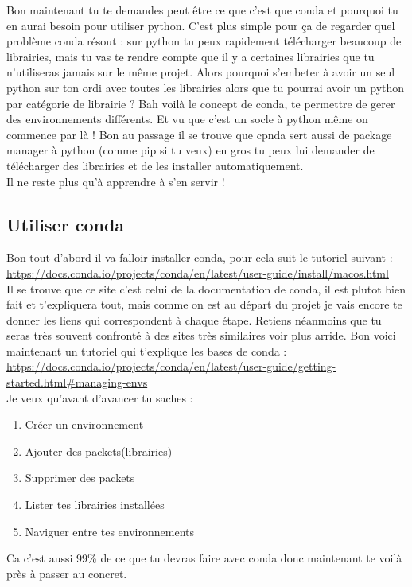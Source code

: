 \documentclass[10pt,a4paper]{book}
\begin{document}
Bon maintenant tu te demandes peut être ce que c'est que conda et pourquoi tu en aurai besoin pour utiliser python. C'est plus simple pour ça de regarder quel problème conda résout : sur python tu peux rapidement télécharger beaucoup de librairies, mais tu vas te rendre compte que il y a certaines librairies que tu n'utiliseras jamais sur le même projet. Alors pourquoi s'embeter à avoir un seul python sur ton ordi avec toutes les librairies alors que tu pourrai avoir un python par catégorie de librairie ? Bah voilà le concept de conda, te permettre de gerer des environnements différents. Et vu que c'est un socle à python même on commence par là ! 
Bon au passage il se trouve que cpnda sert aussi de package manager à python (comme pip si tu veux) en gros tu peux lui demander de télécharger des librairies et de les installer automatiquement.
\\ 
Il ne reste plus qu'à apprendre à s'en servir !

\subsection{Utiliser conda}
Bon tout d'abord il va falloir installer conda, pour cela suit le tutoriel suivant : 
\\
\url{https://docs.conda.io/projects/conda/en/latest/user-guide/install/macos.html}
\\
Il se trouve que ce site c'est celui de la documentation de conda, il est plutot bien fait et t'expliquera tout, mais comme on est au départ du projet je vais encore te donner les liens qui correspondent à chaque étape. Retiens néanmoins que tu seras très souvent confronté à des sites très similaires voir plus arride.
Bon voici maintenant un tutoriel qui t'explique les bases de conda :
\url{https://docs.conda.io/projects/conda/en/latest/user-guide/getting-started.html#managing-envs}
\\
Je veux qu'avant d'avancer tu saches :
\begin{enumerate}
\item Créer un environnement
\item Ajouter des packets(librairies)
\item Supprimer des packets
\item Lister tes librairies installées
\item Naviguer entre tes environnements
\end{enumerate}
 Ca c'est aussi 99\% de ce que tu devras faire avec conda donc maintenant te voilà près à passer au concret.
\newpage
\end{document}
